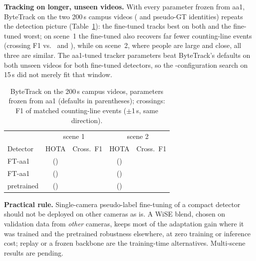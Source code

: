 \ifHaveTrackVone
\textbf{Tracking on longer, unseen videos.} With every parameter frozen from aa1, ByteTrack on the two 200\,s campus
videos (\StVoneGtIds{} and \StVtwoGtIds{} pseudo-GT identities) repeats the detection picture
(Table~\ref{tab:scenetrack}): the fine-tuned \rfdetr{} tracks best on both and the fine-tuned \yolo{} worst; on
scene~1 the fine-tuned \yolo{} also recovers far fewer counting-line events (crossing F1 \StVoneFtCrossFone{} vs.\
\StVoneRfFtCrossFone{} and \StVonePtCrossFone), while on scene~2, where people are large and close, all three are
similar. The aa1-tuned tracker parameters beat ByteTrack's defaults on both unseen videos for both fine-tuned
detectors, so the \GridSize-configuration search on 15\,s did not merely fit that window.
\begin{table}[t]
\centering
\caption{ByteTrack on the 200\,s campus videos, parameters frozen from aa1 (defaults in parentheses); crossings: F1
of matched counting-line events ($\pm$1\,s, same direction).}
\label{tab:scenetrack}
\scriptsize
\setlength{\tabcolsep}{2.2pt}
\begin{tabular}{lcc|cc}
\toprule
 & \multicolumn{2}{c|}{scene 1} & \multicolumn{2}{c}{scene 2} \\
Detector & HOTA & Cross.\ F1 & HOTA & Cross.\ F1 \\
\midrule
\yolo{} FT-aa1 & \StVoneFtHota{} (\StVoneFtHotaDef) & \StVoneFtCrossFone & \StVtwoFtHota{} (\StVtwoFtHotaDef) & \StVtwoFtCrossFone \\
\rfdetr{} FT-aa1 & \StVoneRfFtHota{} (\StVoneRfFtHotaDef) & \StVoneRfFtCrossFone & \StVtwoRfFtHota{} (\StVtwoRfFtHotaDef) & \StVtwoRfFtCrossFone \\
\yolo{} pretrained & \StVonePtHota{} (\StVonePtHotaDef) & \StVonePtCrossFone & \StVtwoPtHota{} (\StVtwoPtHotaDef) & \StVtwoPtCrossFone \\
\bottomrule
\end{tabular}
\end{table}
\fi

\textbf{Practical rule.} Single-camera pseudo-label fine-tuning of a compact detector should not be deployed on
other cameras as is. A WiSE blend, chosen on validation data from \emph{other} cameras, keeps most of the
adaptation gain where it was trained and the pretrained robustness elsewhere, at zero training or inference cost;
replay or a frozen backbone are the training-time alternatives.
\else
Multi-scene results are pending.
\fi
